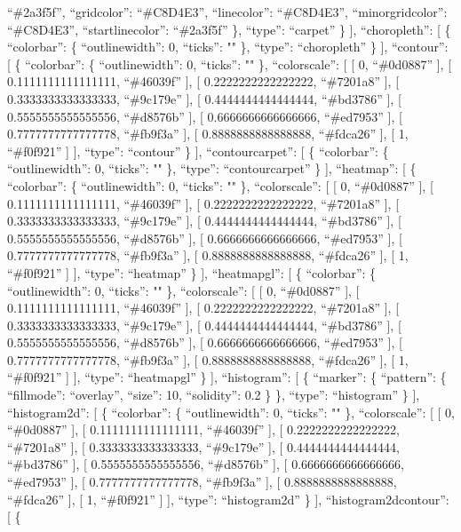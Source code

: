 \documentclass[
]{article}
\begin{document}
``\#2a3f5f'', ``gridcolor'': ``\#C8D4E3'', ``linecolor'': ``\#C8D4E3'',
``minorgridcolor'': ``\#C8D4E3'', ``startlinecolor'': ``\#2a3f5f'' \},
``type'': ``carpet'' \} {]}, ``choropleth'': {[} \{ ``colorbar'': \{
``outlinewidth'': 0, ``ticks'': "" \}, ``type'': ``choropleth'' \} {]},
``contour'': {[} \{ ``colorbar'': \{ ``outlinewidth'': 0, ``ticks'': ""
\}, ``colorscale'': {[} {[} 0, ``\#0d0887'' {]}, {[} 0.1111111111111111,
``\#46039f'' {]}, {[} 0.2222222222222222, ``\#7201a8'' {]}, {[}
0.3333333333333333, ``\#9c179e'' {]}, {[} 0.4444444444444444,
``\#bd3786'' {]}, {[} 0.5555555555555556, ``\#d8576b'' {]}, {[}
0.6666666666666666, ``\#ed7953'' {]}, {[} 0.7777777777777778,
``\#fb9f3a'' {]}, {[} 0.8888888888888888, ``\#fdca26'' {]}, {[} 1,
``\#f0f921'' {]} {]}, ``type'': ``contour'' \} {]}, ``contourcarpet'':
{[} \{ ``colorbar'': \{ ``outlinewidth'': 0, ``ticks'': "" \}, ``type'':
``contourcarpet'' \} {]}, ``heatmap'': {[} \{ ``colorbar'': \{
``outlinewidth'': 0, ``ticks'': "" \}, ``colorscale'': {[} {[} 0,
``\#0d0887'' {]}, {[} 0.1111111111111111, ``\#46039f'' {]}, {[}
0.2222222222222222, ``\#7201a8'' {]}, {[} 0.3333333333333333,
``\#9c179e'' {]}, {[} 0.4444444444444444, ``\#bd3786'' {]}, {[}
0.5555555555555556, ``\#d8576b'' {]}, {[} 0.6666666666666666,
``\#ed7953'' {]}, {[} 0.7777777777777778, ``\#fb9f3a'' {]}, {[}
0.8888888888888888, ``\#fdca26'' {]}, {[} 1, ``\#f0f921'' {]} {]},
``type'': ``heatmap'' \} {]}, ``heatmapgl'': {[} \{ ``colorbar'': \{
``outlinewidth'': 0, ``ticks'': "" \}, ``colorscale'': {[} {[} 0,
``\#0d0887'' {]}, {[} 0.1111111111111111, ``\#46039f'' {]}, {[}
0.2222222222222222, ``\#7201a8'' {]}, {[} 0.3333333333333333,
``\#9c179e'' {]}, {[} 0.4444444444444444, ``\#bd3786'' {]}, {[}
0.5555555555555556, ``\#d8576b'' {]}, {[} 0.6666666666666666,
``\#ed7953'' {]}, {[} 0.7777777777777778, ``\#fb9f3a'' {]}, {[}
0.8888888888888888, ``\#fdca26'' {]}, {[} 1, ``\#f0f921'' {]} {]},
``type'': ``heatmapgl'' \} {]}, ``histogram'': {[} \{ ``marker'': \{
``pattern'': \{ ``fillmode'': ``overlay'', ``size'': 10, ``solidity'':
0.2 \} \}, ``type'': ``histogram'' \} {]}, ``histogram2d'': {[} \{
``colorbar'': \{ ``outlinewidth'': 0, ``ticks'': "" \}, ``colorscale'':
{[} {[} 0, ``\#0d0887'' {]}, {[} 0.1111111111111111, ``\#46039f'' {]},
{[} 0.2222222222222222, ``\#7201a8'' {]}, {[} 0.3333333333333333,
``\#9c179e'' {]}, {[} 0.4444444444444444, ``\#bd3786'' {]}, {[}
0.5555555555555556, ``\#d8576b'' {]}, {[} 0.6666666666666666,
``\#ed7953'' {]}, {[} 0.7777777777777778, ``\#fb9f3a'' {]}, {[}
0.8888888888888888, ``\#fdca26'' {]}, {[} 1, ``\#f0f921'' {]} {]},
``type'': ``histogram2d'' \} {]}, ``histogram2dcontour'': {[} \{
\end{document}
